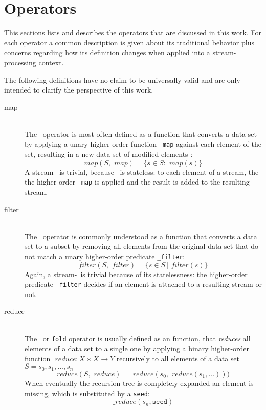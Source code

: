 \section{Operators}
\label{sect:operators}
This sections lists and describes the operators that are discussed in this work.
For each operator a common description is given about its traditional behavior plus concerns regarding how its definition changes when applied into a stream-processing context.

The following definitions have no claim to be universally valid and are only intended to clarify the perspective of this work.
\begin{description}
  \item[map] \hfill \\
  The \map\ operator is most often defined as a function that converts a data set by applying a unary higher-order function \texttt{\_map} against each element of the set, resulting in a new data set of modified elements \cite{Wiki:Map}:
	$$map\left(S, \_map\right)=\{s\in S : \_map(s)\}$$
	A stream-\map\ is trivial, because \map\ is stateless: to each element of a stream, the the higher-order \texttt{\_map} is applied and the result is added to the resulting stream.
  \item[filter] \hfill \\
  The \filter\ operator is commonly understood as a function that converts a data set to a subset by removing all elements from the original data set that do not match a unary higher-order predicate \texttt{\_filter}\cite{Wiki:Filter}:
	$$filter\left(S, \_filter\right)=\{s\in S\ | \_filter\left(s\right)\}$$
	Again, a stream-\filter\ is trivial because of its statelessness: the higher-order predicate \texttt{\_filter} decides if an element is attached to a resulting stream or not.
  \item[reduce] \hfill \\
  The \reduce\ or \texttt{fold} operator is usually\cite{Wiki:Fold} defined as an function, that \textsl{reduces} all elements of a data set to a single one by applying a binary higher-order function
	$\_reduce: X \times X \rightarrow Y $
	recursively to all elements of a data set
	$S={s_0, s_1, ..., s_n}$
	$$ reduce(S, \_reduce)=\_reduce(s_0, \_reduce(s_1, ...))) $$
	When eventually the recursion tree is completely expanded an element is missing, which is substituted by a \texttt{seed}:
	$$ \_reduce(s_n, \texttt{seed}) $$
	

\end{description}

